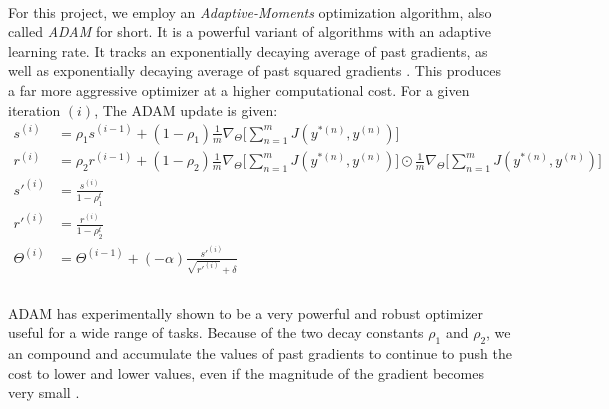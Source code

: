 \documentclass[12pt,letterpaper]{article}
\begin{document}
\paragraph*{}For this project, we employ an \textit{Adaptive-Moments} optimization algorithm, also called \textit{ADAM} for short. It is a powerful variant of algorithms with an adaptive learning rate. It tracks an exponentially decaying average of past gradients, as well as exponentially decaying average of past squared gradients \cite{Geron}. This produces a far more aggressive optimizer at a higher computational cost. For a given iteration $(i)$, The ADAM update is given:
\begin{equation}
\label{eqn-ADAMupdate}
\begin{split}
s^{(i)} &= \rho_1 s^{(i-1)} + (1 - \rho_1) \frac{1}{m} \nabla_{\Theta} \Big[\sum_{n=1}^{m} J(y^{*(n)},y^{(n)}) \Big]  \\
r^{(i)} &= \rho_2 r^{(i-1)} + (1 - \rho_2) \frac{1}{m} \nabla_{\Theta} \Big[\sum_{n=1}^{m} J(y^{*(n)},y^{(n)}) \Big] \odot
							\frac{1}{m} \nabla_{\Theta} \Big[\sum_{n=1}^{m} J(y^{*(n)},y^{(n)}) \Big]  \\
s'^{(i)} &= \frac{s^{(i)}}{1-\rho_1^t} \\
r'^{(i)} &= \frac{r^{(i)}}{1-\rho_2^t} \\
\Theta^{(i)} &= \Theta^{(i-1)} + (-\alpha)\frac{s'^{(i)}}{\sqrt{r'^{(i)}}+\delta} \\
\end{split}
\end{equation}

\paragraph*{}ADAM has experimentally shown to be a very powerful and robust optimizer useful for a wide range of tasks. Because of the two decay constants $\rho_1$ and $\rho_2$, we an compound and accumulate the values of past gradients to continue to push the cost to lower and lower values, even if the magnitude of the gradient becomes very small \cite{Geron}. 
\end{document}
